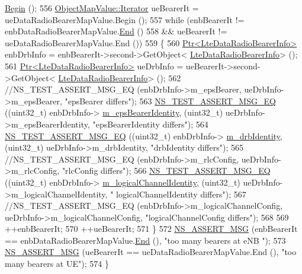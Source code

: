 \begin{DoxyCode}
      \hyperlink{classns3_1_1ObjectPtrContainerValue_a2dd05c2e7483eb2eeeb0b2389f238815}{Begin} ();
556   \hyperlink{classns3_1_1ObjectPtrContainerValue_a1f0661f9cf3626d62a4623f36b672876}{ObjectMapValue::Iterator} ueBearerIt = ueDataRadioBearerMapValue.Begin ();
557   \textcolor{keywordflow}{while} (enbBearerIt != enbDataRadioBearerMapValue.\hyperlink{classns3_1_1ObjectPtrContainerValue_a45b7448cf99d2629260c21f740b904d0}{End} ()
558          && ueBearerIt != ueDataRadioBearerMapValue.End ())
559     \{
560       \hyperlink{classns3_1_1Ptr}{Ptr<LteDataRadioBearerInfo>} enbDrbInfo = enbBearerIt->second->GetObject<
      \hyperlink{classns3_1_1LteDataRadioBearerInfo}{LteDataRadioBearerInfo}> ();
561       \hyperlink{classns3_1_1Ptr}{Ptr<LteDataRadioBearerInfo>} ueDrbInfo = ueBearerIt->second->GetObject<
      \hyperlink{classns3_1_1LteDataRadioBearerInfo}{LteDataRadioBearerInfo}> ();
562       \textcolor{comment}{//NS\_TEST\_ASSERT\_MSG\_EQ (enbDrbInfo->m\_epsBearer, ueDrbInfo->m\_epsBearer, "epsBearer differs");}
563       \hyperlink{group__testing_ga2a9d78cffb3db8e867c35fff0b698cf5}{NS\_TEST\_ASSERT\_MSG\_EQ} ((uint32\_t) enbDrbInfo->
      \hyperlink{classns3_1_1LteDataRadioBearerInfo_ac5ff2de272b88aab06d6a1c34955bc0e}{m\_epsBearerIdentity}, (uint32\_t) ueDrbInfo->m\_epsBearerIdentity, \textcolor{stringliteral}{"epsBearerIdentity
       differs"});
564       \hyperlink{group__testing_ga2a9d78cffb3db8e867c35fff0b698cf5}{NS\_TEST\_ASSERT\_MSG\_EQ} ((uint32\_t) enbDrbInfo->
      \hyperlink{classns3_1_1LteDataRadioBearerInfo_a1f5a7e5404b41179c7519e6bbb168de1}{m\_drbIdentity}, (uint32\_t) ueDrbInfo->m\_drbIdentity, \textcolor{stringliteral}{"drbIdentity differs"});
565       \textcolor{comment}{//NS\_TEST\_ASSERT\_MSG\_EQ (enbDrbInfo->m\_rlcConfig, ueDrbInfo->m\_rlcConfig, "rlcConfig differs");}
566       \hyperlink{group__testing_ga2a9d78cffb3db8e867c35fff0b698cf5}{NS\_TEST\_ASSERT\_MSG\_EQ} ((uint32\_t) enbDrbInfo->
      \hyperlink{classns3_1_1LteDataRadioBearerInfo_a53a3b4d3b2eeda6e22c32d42163ae558}{m\_logicalChannelIdentity}, (uint32\_t) ueDrbInfo->m\_logicalChannelIdentity, \textcolor{stringliteral}{"
      logicalChannelIdentity differs"});
567       \textcolor{comment}{//NS\_TEST\_ASSERT\_MSG\_EQ (enbDrbInfo->m\_logicalChannelConfig, ueDrbInfo->m\_logicalChannelConfig,
       "logicalChannelConfig differs");}
568 
569       ++enbBearerIt;
570       ++ueBearerIt;
571     \}
572   \hyperlink{assert_8h_aff5ece9066c74e681e74999856f08539}{NS\_ASSERT\_MSG} (enbBearerIt == enbDataRadioBearerMapValue.\hyperlink{classns3_1_1ObjectPtrContainerValue_a45b7448cf99d2629260c21f740b904d0}{End} (), \textcolor{stringliteral}{"too many bearers at eNB
      "});
573   \hyperlink{assert_8h_aff5ece9066c74e681e74999856f08539}{NS\_ASSERT\_MSG} (ueBearerIt == ueDataRadioBearerMapValue.End (), \textcolor{stringliteral}{"too many bearers at UE"});
574 \}
\end{DoxyCode}


